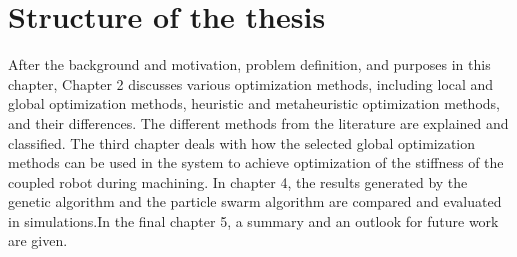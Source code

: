 \section{Structure of the thesis} \label{sec:Introduction:Purpose}
After the background and motivation, problem definition, and purposes in this chapter, Chapter 2 discusses various optimization methods, including local and global optimization methods, heuristic and metaheuristic optimization methods, and their differences.
The different methods from the literature are explained and classified. The third chapter deals with how the selected global optimization methods can be used in the system to achieve optimization of the stiffness of the coupled robot during machining. In chapter
4, the results generated by the genetic algorithm and the particle swarm algorithm are compared and evaluated in simulations.In the final chapter 5, a summary and an outlook for future work are given.


















